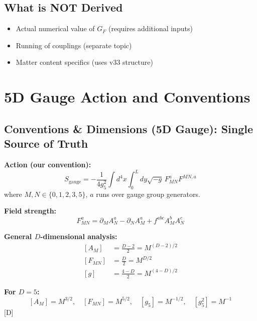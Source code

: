 \documentclass[11pt,a4paper]{article}
\newcommand{\tagD}{\textcolor{blue!70!black}{[D]}}
\begin{document}
\subsection{What is NOT Derived}
\begin{itemize}
    \item Actual numerical value of $G_F$ (requires additional inputs)
    \item Running of couplings (separate topic)
    \item Matter content specifics (uses v33 structure)
\end{itemize}

\section{5D Gauge Action and Conventions}

\subsection{Conventions \& Dimensions (5D Gauge): Single Source of Truth}

\begin{resultbox}
\label{box:dim-conventions}
\textbf{Action (our convention):}
\begin{equation}
\label{eq:5d-gauge-action}
S_{\text{gauge}} = -\frac{1}{4g_5^2} \int d^4x \int_0^L dy \sqrt{-g}\, F_{MN}^a F^{MN,a}
\end{equation}
where $M,N \in \{0,1,2,3,5\}$, $a$ runs over gauge group generators.

\textbf{Field strength:}
\begin{equation}
\label{eq:FMN-def}
F_{MN}^a = \partial_M A_N^a - \partial_N A_M^a + f^{abc} A_M^b A_N^c
\end{equation}

\textbf{General $D$-dimensional analysis:}
\begin{align}
\label{eq:dim-D-A}
[A_M] &= \frac{D-2}{2} = M^{(D-2)/2} \\
\label{eq:dim-D-F}
[F_{MN}] &= \frac{D}{2} = M^{D/2} \\
\label{eq:dim-D-g}
[g] &= \frac{4-D}{2} = M^{(4-D)/2}
\end{align}

\textbf{For $D=5$:}
\begin{equation}
\label{eq:dim-5d-explicit}
\boxed{[A_M] = M^{3/2}, \quad [F_{MN}] = M^{5/2}, \quad [g_5] = M^{-1/2}, \quad [g_5^2] = M^{-1}}
\end{equation}
\tagD
\end{resultbox}
\end{document}
